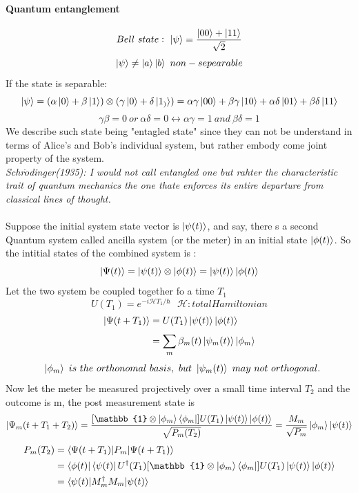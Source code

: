 \documentclass[]{article}
\theoremstyle{nonumberplain}
\begin{document}
\paragraph{Quantum entanglement}%
\label{par:quantum_entanglement}
\[
Bell\ state:\ \ket{\psi}=\frac{\ket{00}+\ket{11}}{\sqrt{2}}
\] 
\[
\ket{\psi}\neq \ket{a}\ket{b}\ non-sepearable
\] 
If the state is separable:
\[
	\ket{\psi} = (\alpha\ket{0}+\beta\ket{1})\otimes(\gamma\ket{0}+\delta\ket{1_{)}}) = \alpha\gamma\ket{00}+\beta\gamma\ket{10}+\alpha\delta\ket{01}+\beta\delta\ket{11}
\] 
\[
\gamma\beta =  0 \  or \ \alpha\delta=0 \leftrightarrow \alpha\gamma =1 \ and \ \beta\delta = 1
\] 
We describe such state being "entagled state" since they can not be understand in terms of Alice's and Bob's individual system, but rather embody come joint property of the system.\\
\newpage
\textit{Schr$\ddot{o}$dinger(1935): I would not call entangled one but rahter the characteristic trait of quantum mechanics the one thate enforces its entire departure from classical lines of thought.}\\ \\
Suppose the initial system state vector is $\ket{\psi(t)}$, and say, there s a second Quantum system called ancilla system (or the meter) in an initial state $\ket{\phi(t)}$. So the intitial states of the combined system is :
\[
	\ket{\Psi(t)}=\ket{\psi(t)}\otimes\ket{\phi(t)}=\ket{\psi(t)}\ket{\phi(t)}
\] 
Let the two system be coupled together fo a time $T_{1}$
\[
	U(T_1) = e^{-i\mathcal{H}T_{1}/\hbar} \ \ \ \mathcal{H}: total Hamiltonian 
\] 
\begin{equation*}
\begin{align*}
	\ket{\Psi(t+T_1)}&=U(T_{1})\ket{\psi(t)}\ket{\phi(t)}\\
						  &= \sum^{}_{m} \beta_{m}(t)\ket{\psi_{m}(t)}\ket{\phi_{m}} 
\end{align*}
\end{equation*}
\[
\ \ \ket{\phi_{m}}\ is\ the\ orthonomal\  basis,\ but\ \ket{\psi_{m}(t)}\ may\ not\ orthogonal. 
\] 
Now let the meter be measured projectively over a small time interval $T_{2}$ and the outcome is m, the post measurement state is 
\[
	\ket{\Psi_{m}(t+T_{1}+T_{2})} = \frac{[\mathbb{1}\otimes \ket{\phi_{m}}\bra{\phi_{m}}]U(T_{1})\ket{\psi(t)}\ket{\phi(t)}}{\sqrt{P_{m}(T_{2})}}=\frac{M_{m}}{\sqrt{P_{m}}}\ket{\phi_{m}}\ket{\psi(t)}
\] 
\begin{equation*}
\begin{aligned}
	P_{m}(T_{2}) &= \braket{\Psi(t+T_{1})|P_{m}|\Psi(t+T_{1})} \\
					 &= \bra{\phi(t)}\bra{\psi(t)}U^{\dagger}(T_{1})[\mathbb{1}\otimes \ket{\phi_{m}}\bra{\phi_{m}}]U(T_{1})\ket{\psi(t)}\ket{\phi(t)}\\
					 &= \braket{\psi(t)|M_{m}^{\dagger}M_{m}|\psi(t)}\ \\ 
\end{aligned}
\end{equation*}
\end{document}
